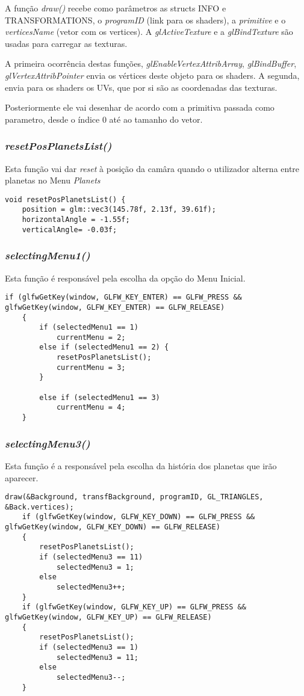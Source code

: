 A função \textit{draw()} recebe como parâmetros as structs INFO e TRANSFORMATIONS, o \textit{programID} (link para os shaders), a \textit{primitive} e o \textit{verticesName} (vetor com os vertices).
A \textit{glActiveTexture} e a \textit{glBindTexture} são usadas para carregar as texturas.

A primeira ocorrência destas funções, \textit{glEnableVertexAttribArray}, \textit{glBindBuffer}, \textit{glVertexAttribPointer} envia os vértices deste objeto para os shaders.
A segunda, envia para os shaders os UVs, que por si são as coordenadas das texturas.

Posteriormente ele vai desenhar de acordo com a primitiva passada como parametro, desde o índice 0 até ao tamanho do vetor.


\subsubsection{\textit{resetPosPlanetsList()}}
Esta função vai dar \textit{reset} à posição da camâra quando o utilizador alterna entre planetas no Menu \textit{Planets}
\begin{lstlisting}[caption=\textit{resetPosPlanetsList()}.]
void resetPosPlanetsList() {
	position = glm::vec3(145.78f, 2.13f, 39.61f);
	horizontalAngle = -1.55f;
	verticalAngle= -0.03f;
\end{lstlisting}

\subsubsection{\textit{selectingMenu1()}}
Esta função é responsável pela escolha da opção do Menu Inicial.
\begin{lstlisting}[caption=\textit{ Pequeno excerto da função selectingMenu1()}.]
	if (glfwGetKey(window, GLFW_KEY_ENTER) == GLFW_PRESS && glfwGetKey(window, GLFW_KEY_ENTER) == GLFW_RELEASE)
	{
		if (selectedMenu1 == 1)
			currentMenu = 2;
		else if (selectedMenu1 == 2) {
			resetPosPlanetsList();
			currentMenu = 3;
		}

		else if (selectedMenu1 == 3)
			currentMenu = 4;
	}
\end{lstlisting}


\subsubsection{\textit{selectingMenu3()}}
Esta função é a responsável pela escolha da história dos planetas que irão aparecer.
\begin{lstlisting}[caption=\textit{ Pequeno excerto da função selectingMenu3()}.]
draw(&Background, transfBackground, programID, GL_TRIANGLES, &Back.vertices);
	if (glfwGetKey(window, GLFW_KEY_DOWN) == GLFW_PRESS && glfwGetKey(window, GLFW_KEY_DOWN) == GLFW_RELEASE)
	{
		resetPosPlanetsList();
		if (selectedMenu3 == 11)
			selectedMenu3 = 1;
		else
			selectedMenu3++;
	}
	if (glfwGetKey(window, GLFW_KEY_UP) == GLFW_PRESS && glfwGetKey(window, GLFW_KEY_UP) == GLFW_RELEASE)
	{
		resetPosPlanetsList();
		if (selectedMenu3 == 1)
			selectedMenu3 = 11;
		else
			selectedMenu3--;
	}
\end{lstlisting}

